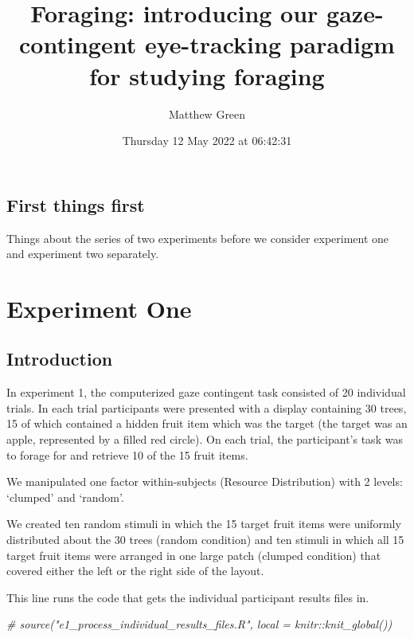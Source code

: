 \documentclass[
]{book}
\title{Foraging: introducing our gaze-contingent eye-tracking paradigm for studying foraging}
\author{Matthew Green}
\date{Thursday 12 May 2022 at 06:42:31}
\newenvironment{Shaded}{\begin{snugshade}}{\end{snugshade}}
\newcommand{\CommentTok}[1]{\textcolor[rgb]{0.56,0.35,0.01}{\textit{#1}}}
\begin{document}
\maketitle

{
\setcounter{tocdepth}{1}
\tableofcontents
}
\hypertarget{first-things-first}{%
\chapter{First things first}\label{first-things-first}}

Things about the series of two experiments before we consider experiment one and experiment two separately.

\hypertarget{part-experiment-one}{%
\part{Experiment One}\label{part-experiment-one}}

\hypertarget{introduction}{%
\chapter{Introduction}\label{introduction}}

In experiment 1, the computerized gaze contingent task consisted of 20 individual trials. In each trial participants were presented with a display containing 30 trees, 15 of which contained a hidden fruit item which was the target (the target was an apple, represented by a filled red circle). On each trial, the participant's task was to forage for and retrieve 10 of the 15 fruit items.

We manipulated one factor within-subjects (Resource Distribution) with 2 levels: `clumped' and `random'.

We created ten random stimuli in which the 15 target fruit items were uniformly distributed about the 30 trees (random condition) and ten stimuli in which all 15 target fruit items were arranged in one large patch (clumped condition) that covered either the left or the right side of the layout.

This line runs the code that gets the individual participant results files in.

\begin{Shaded}
\begin{Highlighting}[]
\CommentTok{\# source("e1\_process\_individual\_results\_files.R", local = knitr::knit\_global())}
\end{Highlighting}
\end{Shaded}
\end{document}
